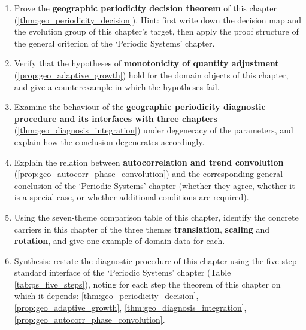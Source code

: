 \begin{enumerate}[leftmargin=3em, label=\textbf{Exercise \arabic*}]
    \item Prove the \textbf{geographic periodicity decision theorem} of this chapter (\ref{thm:geo_periodicity_decision}). Hint: first write down the decision map and the evolution group of this chapter's target, then apply the proof structure of the general criterion of the `Periodic Systems' chapter.

    \item Verify that the hypotheses of \textbf{monotonicity of quantity adjustment} (\ref{prop:geo_adaptive_growth}) hold for the domain objects of this chapter, and give a counterexample in which the hypotheses fail.

    \item Examine the behaviour of the \textbf{geographic periodicity diagnostic procedure and its interfaces with three chapters} (\ref{thm:geo_diagnosis_integration}) under degeneracy of the parameters, and explain how the conclusion degenerates accordingly.

    \item Explain the relation between \textbf{autocorrelation and trend convolution} (\ref{prop:geo_autocorr_phase_convolution}) and the corresponding general conclusion of the `Periodic Systems' chapter (whether they agree, whether it is a special case, or whether additional conditions are required).

    \item Using the seven-theme comparison table of this chapter, identify the concrete carriers in this chapter of the three themes \textbf{translation}, \textbf{scaling} and \textbf{rotation}, and give one example of domain data for each.

    \item Synthesis: restate the diagnostic procedure of this chapter using the five-step standard interface of the `Periodic Systems' chapter (Table \ref{tab:ps_five_steps}), noting for each step the theorem of this chapter on which it depends: \ref{thm:geo_periodicity_decision}, \ref{prop:geo_adaptive_growth}, \ref{thm:geo_diagnosis_integration}, \ref{prop:geo_autocorr_phase_convolution}.
\end{enumerate}


